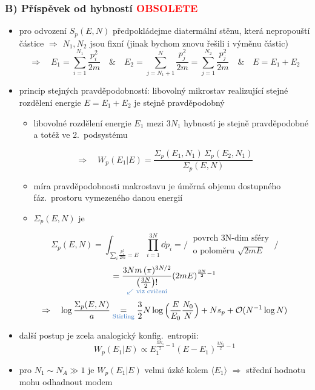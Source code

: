 \subsubsection*{B) Příspěvek od hybností \quad \textcolor{Red}{\large OBSOLETE}}
\begin{itemize}
  \item pro odvození $S_p(E,N)$ předpokládejme diatermální stěnu, která nepropouští částice $\Rightarrow$ $N_1, N_2$ jsou fixní (jinak bychom znovu řešili i výměnu částic)
  \[
    \Rightarrow\quad E_1 = \sum_{i=1}^{N_1}\frac{p_i^2}{2m} \quad\&\quad E_2 = \sum_{j=N_1+1}^{N}\frac{p_j^2}{2m} = \sum_{j=1}^{N_2}\frac{p_j^2}{2m} \quad\&\quad E = E_1 + E_2
  \]
  \item princip stejných pravděpodobností: libovolný mikrostav realizující stejné rozdělení energie $E = E_1 + E_2$ je stejně pravděpodobný
  \begin{itemize}
    \item[$\Rightarrow$] libovolné rozdělení energie $E_1$ mezi $3N_1$ hybností je stejně pravděpodobné a totéž ve 2.\ podsystému
  \end{itemize}
  \[
    \Rightarrow\quad W_p(E_1|E) = \frac{\Sigma_p(E_1,N_1)\,\Sigma_p(E_2,N_1)}{\Sigma_p(E,N)}
  \]
  \begin{itemize}
    \item[$\to$] míra pravděpodobnosti makrostavu je úměrná objemu dostupného fáz.\ prostoru vymezeného danou energií
    \item[$\to$] $\Sigma_p(E,N)$ je 
  \end{itemize}
  \[
    \Sigma_p(E,N) = \int_{\sum_i\frac{p_i^2}{2m} = E}\prod_{i=1}^{3N}\dd p_i
    = \Big/\ \begin{array}{c}\text{povrch 3N-dim sféry}\\ \text{o poloměru } \sqrt{2mE}\end{array}\ \Big/
  \]
  \[
    = \underset{\textcolor{NavyBlue}{\swarrow\ \text{viz cvičení}}}{\frac{3Nm\,(\pi)^{3N/2}}{\big(\frac{3N}{2}\big)!}}(2mE)^{\frac{3N}{2}-1}
  \]
  \[
    \Rightarrow\quad \log\frac{\Sigma_p(E,N)}{a} \underset{\textcolor{NavyBlue}{\text{Stirling}}}{=} \frac32N\log\Big(\frac{E}{E_0}\frac{N_0}{N}\Big) + Ns_p + \mathcal O(N^{-1}\log N)
  \]
  \item další postup je zcela analogický konfig.\ entropii:
  \[
    W_p(E_1|E) \propto E_1^{\frac{3N_1}{2}-1}(E - E_1)^{\frac{3N_2}{2}-1}
  \]
  \item pro $N_1\sim N_A\gg 1$ je $W_p(E_1|E)$ velmi úzké kolem $\langle E_1\rangle$ $\Rightarrow$ střední hodnotu mohu odhadnout modem

\end{itemize}
